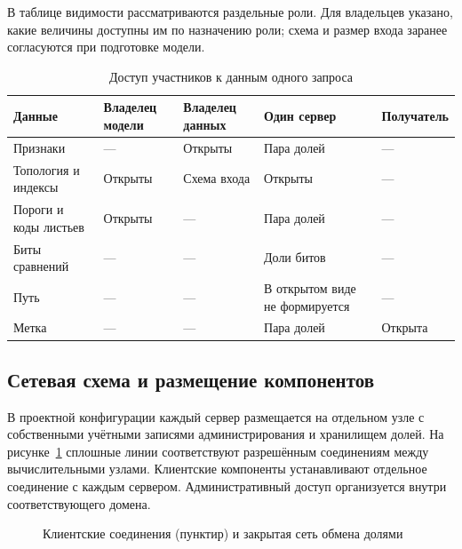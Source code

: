 В таблице видимости рассматриваются раздельные роли. Для владельцев
указано, какие величины доступны им по назначению роли; схема и размер
входа заранее согласуются при подготовке модели.
\begin{table}[htbp]
\caption{Доступ участников к данным одного запроса}
\centering\small
\begin{tabularx}{\linewidth}{|X|X|X|X|X|}
\hline
Данные & Владелец модели & Владелец данных & Один сервер & Получатель \\ \hline
Признаки & --- & Открыты & Пара долей & --- \\ \hline
Топология и индексы & Открыты & Схема входа & Открыты & --- \\ \hline
Пороги и коды листьев & Открыты & --- & Пара долей & --- \\ \hline
Биты сравнений & --- & --- & Доли битов & --- \\ \hline
Путь & --- & --- & В открытом виде не формируется & --- \\ \hline
Метка & --- & --- & Пара долей & Открыта \\ \hline
\end{tabularx}
\end{table}

\subsection{Сетевая схема и размещение компонентов}

В проектной конфигурации каждый сервер размещается на отдельном узле с собственными учётными записями администрирования и хранилищем долей. На рисунке~\ref{fig:network} сплошные линии соответствуют разрешённым соединениям между вычислительными узлами. Клиентские компоненты устанавливают отдельное соединение с каждым сервером. Административный доступ организуется внутри соответствующего домена.
\begin{figure}[htbp]
\centering
{}
\caption{Клиентские соединения (пунктир) и закрытая сеть обмена долями}
\label{fig:network}
\end{figure}

